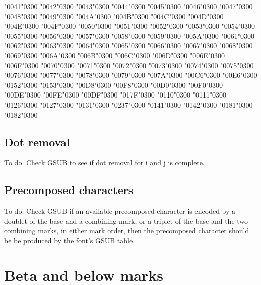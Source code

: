 \documentclass[landscape]{article}
\begin{document}
{{\char"0041\char"0300} {\char"0042\char"0300} {\char"0043\char"0300} {\char"0044\char"0300} {\char"0045\char"0300} {\char"0046\char"0300} {\char"0047\char"0300} {\char"0048\char"0300} {\char"0049\char"0300} {\char"004A\char"0300} {\char"004B\char"0300} {\char"004C\char"0300} {\char"004D\char"0300} {\char"004E\char"0300} {\char"004F\char"0300} {\char"0050\char"0300} {\char"0051\char"0300} {\char"0052\char"0300} {\char"0053\char"0300} {\char"0054\char"0300} {\char"0055\char"0300} {\char"0056\char"0300} {\char"0057\char"0300} {\char"0058\char"0300} {\char"0059\char"0300} {\char"005A\char"0300}
{\char"0061\char"0300} {\char"0062\char"0300} {\char"0063\char"0300} {\char"0064\char"0300} {\char"0065\char"0300} {\char"0066\char"0300} {\char"0067\char"0300} {\char"0068\char"0300} {\char"0069\char"0300} {\char"006A\char"0300} {\char"006B\char"0300} {\char"006C\char"0300} {\char"006D\char"0300} {\char"006E\char"0300} {\char"006F\char"0300} {\char"0070\char"0300} {\char"0071\char"0300} {\char"0072\char"0300} {\char"0073\char"0300} {\char"0074\char"0300} {\char"0075\char"0300} {\char"0076\char"0300} {\char"0077\char"0300} {\char"0078\char"0300} {\char"0079\char"0300} {\char"007A\char"0300}
{\char"00C6\char"0300} {\char"00E6\char"0300} {\char"0152\char"0300} {\char"0153\char"0300} {\char"00D8\char"0300} {\char"00F8\char"0300} {\char"00D0\char"0300} {\char"00F0\char"0300} {\char"00DE\char"0300} {\char"00FE\char"0300} {\char"00DF\char"0300} {\char"017F\char"0300} {\char"0110\char"0300} {\char"0111\char"0300} {\char"0126\char"0300} {\char"0127\char"0300} {\char"0131\char"0300} {\char"0237\char"0300} {\char"0141\char"0300} {\char"0142\char"0300} {\char"0181\char"0300} {\char"0182\char"0300}
}

\subsection*{Dot removal}

To do. 
Check GSUB to see if dot removal for i and j is complete.

\subsection*{Precomposed characters}
To do.
Check GSUB if an available precomposed character is encoded 
by a doublet of the base and a combining mark, 
or a triplet of the base and the two combining marks, in either mark order, 
then the precomposed character should be be produced by the font's GSUB table.

\newpage
\section*{Beta and below marks}
\end{document}
